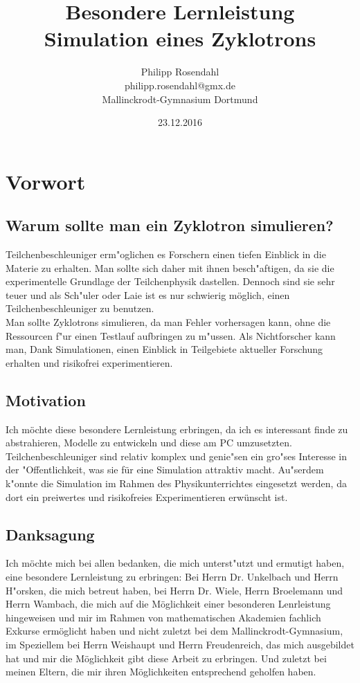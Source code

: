 \documentclass[14pt, a4paper]{report}
\begin{document}
\title{Besondere Lernleistung \\ Simulation eines Zyklotrons }
\author{Philipp Rosendahl \\ philipp.rosendahl@gmx.de \\ Mallinckrodt-Gymnasium Dortmund}
\date{23.12.2016}
\maketitle

\tableofcontents

\chapter{Vorwort}
\section{Warum sollte man ein Zyklotron simulieren?}
Teilchenbeschleuniger erm"oglichen es Forschern einen tiefen Einblick in die
Materie zu erhalten. Man sollte sich daher mit ihnen besch"aftigen, da sie die
experimentelle Grundlage der Teilchenphysik dastellen. Dennoch sind sie sehr
teuer und als Sch"uler oder Laie ist es nur schwierig möglich, einen
Teilchenbeschleuniger zu benutzen. \\
Man sollte Zyklotrons simulieren, da man Fehler vorhersagen kann, ohne die Ressourcen
f"ur einen Testlauf aufbringen zu m"ussen. Als Nichtforscher kann man, Dank Simulationen, einen Einblick in Teilgebiete aktueller Forschung erhalten und risikofrei experimentieren.
\section{Motivation}
Ich möchte diese besondere Lernleistung erbringen, da ich es interessant finde 
zu abstrahieren, Modelle zu entwickeln und diese am PC umzusetzten. 
Teilchenbeschleuniger sind relativ komplex und genie"sen ein gro"ses Interesse
in der "Offentlichkeit, was sie für eine Simulation attraktiv macht. Au"serdem
k"onnte die Simulation im Rahmen des Physikunterrichtes eingesetzt werden, da dort 
ein preiwertes und risikofreies Experimentieren erwünscht ist.
\section{Danksagung}
Ich möchte mich bei allen bedanken, die mich unterst"utzt und ermutigt haben, eine
besondere Lernleistung zu erbringen: Bei Herrn Dr. Unkelbach und Herrn H"orsken, 
die mich betreut haben, bei Herrn Dr. Wiele, Herrn Broelemann und Herrn Wambach, 
die mich auf die Möglichkeit einer besonderen Lenrleistung hingeweisen und mir im
Rahmen von mathematischen Akademien fachlich Exkurse ermöglicht haben und nicht 
zuletzt bei dem Mallinckrodt-Gymnasium, im Speziellem bei Herrn Weishaupt und Herrn
Freudenreich, das mich ausgebildet hat und mir die Möglichkeit gibt diese Arbeit zu
erbringen. Und zuletzt bei meinen Eltern, die mir ihren Möglichkeiten entsprechend
geholfen haben.
\end{document}
